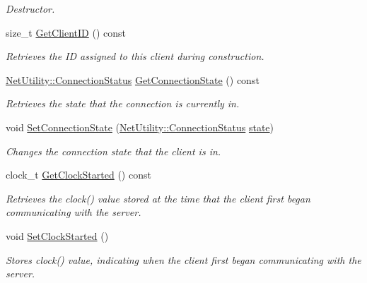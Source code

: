\begin{DoxyCompactItemize}
\begin{DoxyCompactList}\small\item\em Destructor. \item\end{DoxyCompactList}\item 
size\_\-t \hyperlink{class_net_server_client_a6b78eff8935cdef03e891f90013a1561}{GetClientID} () const 
\begin{DoxyCompactList}\small\item\em Retrieves the ID assigned to this client during construction. \item\end{DoxyCompactList}\item 
\hyperlink{class_net_utility_a7eae52138f8bd597ffc67ebf07e86b6d}{NetUtility::ConnectionStatus} \hyperlink{class_net_server_client_afc9d5fb12ec4ac1f41d0760777793260}{GetConnectionState} () const 
\begin{DoxyCompactList}\small\item\em Retrieves the state that the connection is currently in. \item\end{DoxyCompactList}\item 
void \hyperlink{class_net_server_client_ac4a6c279bed8a1cd45de0d2856bd18c6}{SetConnectionState} (\hyperlink{class_net_utility_a7eae52138f8bd597ffc67ebf07e86b6d}{NetUtility::ConnectionStatus} \hyperlink{class_net_instance_a8eda1eb1e030ca5edfc292d97b8efbed}{state})
\begin{DoxyCompactList}\small\item\em Changes the connection state that the client is in. \item\end{DoxyCompactList}\item 
clock\_\-t \hyperlink{class_net_server_client_a42cf42f1a870f32cc9020c3a522b2f0c}{GetClockStarted} () const 
\begin{DoxyCompactList}\small\item\em Retrieves the clock() value stored at the time that the client first began communicating with the server. \item\end{DoxyCompactList}\item 
void \hyperlink{class_net_server_client_adff1d2eea3825b0c85b4a390b38ce75e}{SetClockStarted} ()
\begin{DoxyCompactList}\small\item\em Stores clock() value, indicating when the client first began communicating with the server. \item\end{DoxyCompactList}\item 

\end{DoxyCompactItemize}

